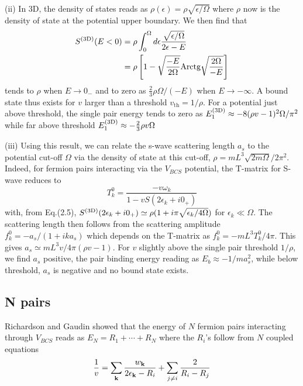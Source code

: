 \documentclass[5p,twocolumn]{elsarticle}
\begin{document}
(ii) In 3D, the density of states reads as  
$\rho(\epsilon)=\rho\sqrt{\epsilon/\Omega}$
where $\rho$ now is the density of state at the potential upper boundary. We then find that
\begin{equation}
\begin{split}
S^{{\text{(3D)}}}(E<0)&=\rho\int_0^{\Omega}{}d\epsilon\frac{\sqrt{\epsilon/\Omega}}{2\epsilon-E}\\
	&=\rho\left[1-\sqrt{\frac{-E}{2\Omega}}\text{Arctg}\sqrt{\frac{2\Omega}{-E}}\right]
\end{split}
\end{equation}
tends to $\rho$ when $E\rightarrow0_-$ and to zero as $\frac{2}{3}\rho\Omega/(-E)$ when $E\rightarrow-\infty$. 
A bound state thus exists for $v$ larger than a threshold $v_{\text{th}}=1/\rho$.  For a potential just above threshold, the single pair energy tends to zero as 
$
E_1^{{\text{(3D)}}}\approx-8(\rho v-1)^2\Omega/\pi^2
$
while far above threshold
$E_1^{{\text{(3D)}}}\approx-\frac{2}{3}\rho{v}\Omega$

(iii) Using this result, we can relate the s-wave scattering length $a_{s}$ to the potential cut-off $\Omega$ via the density of state  at this cut-off, $\rho=mL^3\sqrt{2m\Omega}/2\pi^2$. Indeed, for fermion pairs interacting via the $V_{BCS}$ potential, the T-matrix for S-wave  reduces to
\begin{equation}
T^{0}_{k}=\frac{-v\omega_k}{1-vS(2\epsilon_k+i0_+)}
\end{equation}
with, from Eq.(2.5), $S^{{\text{(3D)}}}(2\epsilon_k+i0_+)\simeq\rho(1+i\pi\sqrt{\epsilon_k/4\Omega})$  for $\epsilon_k\ll\Omega$. The scattering length then follows from the scattering amplitude $f^0_k= -a_s/(1+ika_s)$ which depends on the T-matrix as $f^0_k= -mL^3T^{0}_{k}/4\pi$. This gives $a_s\simeq mL^3v/4\pi(\rho v-1)$. For $v$ slightly above the single pair threshold $1/\rho $, we find $a_s$ positive, the pair binding energy reading as $E_{b}\approx-1/ma_s^{2}$, while below threshold, $a_s$ is negative and no bound state exists. 

\subsection{N pairs\label{sec:NPair}}
Richardson \cite{Richardson1} and Gaudin \cite{gaudin} showed that the energy of $N$ fermion pairs interacting through $V_ {BCS}$ reads as $E_N=R_1+\cdots+R_N$ where the $R_i$'s follow from $N$ coupled equations
\begin{equation}
\frac{1}{v}=\sum_{\mathbf{k}}\frac{w_{\mathbf{k}}}{2\epsilon_{\mathbf{k}}-R_i}+\sum_{j\neq{}i}\frac{2}{R_i-R_j}
\end{equation}
\end{document}
